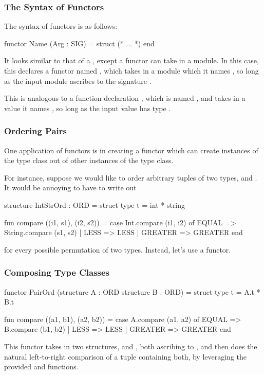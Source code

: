 \documentclass[aspectratio=169]{beamer}
\begin{document}
\begin{frame}[fragile]
  \frametitle{The Syntax of Functors}

  The syntax of functors is as follows:

  \begin{codeblock}
    functor Name (Arg : SIG) =
      struct 
        (* ... *)
      end
  \end{codeblock}

  It looks similar to that of a , except a functor can take in
  a module. In this case, this declares a functor named , which takes 
  in a module which it names , so long as the input module ascribes to 
  the signature .

  This is analogous to a function declaration , 
  which is named , and takes in a value it names , so long as
  the input value has type . 
\end{frame}

\begin{frame}[fragile]
  \frametitle{Ordering Pairs}

  One application of functors is in creating a functor which can create instances
  of the  type class out of other instances of the  type class.

  For instance, suppose we would like to order arbitrary tuples of two types,
   and . It would be annoying to have to write out

  \begin{codeblock}
    structure IntStrOrd : ORD =
      struct 
        type t = int * string

        fun compare ((i1, s1), (i2, s2)) =
          case Int.compare (i1, i2) of
            EQUAL   => String.compare (s1, s2)
          | LESS    => LESS  
          | GREATER => GREATER
      end 
  \end{codeblock}

  for every possible permutation of two types. Instead, let's use a functor.
\end{frame}

\begin{frame}[fragile]
  \frametitle{Composing Type Classes}

  \begin{codeblock}
    functor PairOrd (structure A : ORD 
                     structure B : ORD) =
      struct
        type t = A.t * B.t

        fun compare ((a1, b1), (a2, b2)) =
          case A.compare (a1, a2) of
            EQUAL   => B.compare (b1, b2)
          | LESS    => LESS
          | GREATER => GREATER
      end
  \end{codeblock}

  This functor takes in two structures,  and , both ascribing
  to , and then does the natural left-to-right comparison of a 
  tuple containing both, by leveraging the provided  and 
   functions.
\end{frame}
\end{document}
